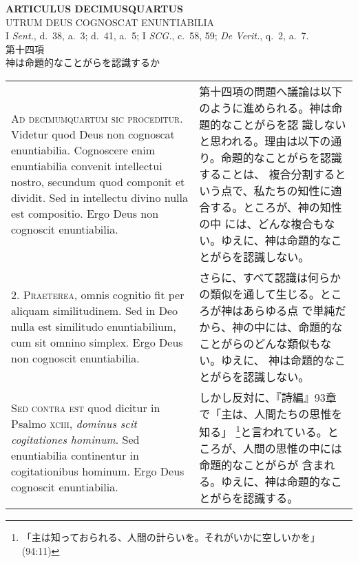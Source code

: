 \documentclass[10pt]{jsarticle} %
\begin{document}
\begin{center}
{\Large {\bf ARTICULUS DECIMUSQUARTUS}}\\ {\large UTRUM DEUS COGNOSCAT
ENUNTIABILIA}\\ {\footnotesize I {\itshape Sent.}, d.~38, a.~3; d.~41,
a.~5; I {\itshape SCG.}, c.~58, 59; {\itshape De Verit.}, q.~2,
a.~7.}\\ {\Large 第十四項\\神は命題的なことがらを認識するか}
\end{center}

\begin{longtable}{p{21em}p{21em}}



{\huge A}{\scshape d decimumquartum sic proceditur}. Videtur quod Deus
non cognoscat enuntiabilia. Cognoscere enim enuntiabilia convenit
intellectui nostro, secundum quod componit et dividit. Sed in
intellectu divino nulla est compositio. Ergo Deus non cognoscit
enuntiabilia.


&

第十四項の問題へ議論は以下のように進められる。神は命題的なことがらを認
識しないと思われる。理由は以下の通り。命題的なことがらを認識することは、
複合分割するという点で、私たちの知性に適合する。ところが、神の知性の中
には、どんな複合もない。ゆえに、神は命題的なことがらを認識しない。

\\


{\scshape 2. Praeterea}, omnis cognitio fit per aliquam
similitudinem. Sed in Deo nulla est similitudo enuntiabilium, cum sit
omnino simplex. Ergo Deus non cognoscit enuntiabilia.


&

さらに、すべて認識は何らかの類似を通して生じる。ところが神はあらゆる点
で単純だから、神の中には、命題的なことがらのどんな類似もない。ゆえに、
神は命題的なことがらを認識しない。

\\


{\scshape Sed contra est} quod dicitur in Psalmo {\scshape xciii},
{\itshape dominus scit cogitationes hominum}. Sed enuntiabilia
continentur in cogitationibus hominum. Ergo Deus cognoscit
enuntiabilia.


&

しかし反対に、『詩編』93章で「主は、人間たちの思惟を知る」
\footnote{「主は知っておられる、人間の計らいを。それがいかに空しいかを」
(94:11)}と言われている。ところが、人間の思惟の中には命題的なことがらが
含まれる。ゆえに、神は命題的なことがらを認識する。


\end{longtable}
\end{document}
